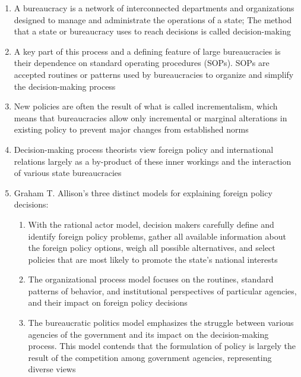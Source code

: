 \documentclass[12pt]{article}
\begin{document}
\begin{enumerate}
      \item A bureaucracy is a network of interconnected departments and organizations designed to manage and administrate the operations of a state; The method that a state or bureaucracy uses to reach decisions is called decision-making 

      \item A key part of this process and a defining feature of large bureaucracies is their dependence on standard operating procedures (SOPs). SOPs are accepted routines or patterns used by bureaucracies to organize and simplify the decision-making process

      \item New policies are often the result of what is called incrementalism, which means that bureaucracies allow only incremental or marginal alterations in existing policy to prevent major changes from established norms

      \item Decision-making process theorists view foreign policy and international relations largely as a by-product of these inner workings and the interaction of various state bureaucracies

      \item Graham T. Allison’s three distinct models for explaining foreign policy decisions:

        \begin{enumerate}

          \item With the rational actor model, decision makers carefully define and identify foreign policy problems, gather all available information about the foreign policy options, weigh all possible alternatives, and select policies that are most likely to promote the state’s national interests

          \item The organizational process model focuses on the routines, standard patterns of behavior, and institutional perspectives of particular agencies, and their impact on foreign policy decisions

          \item The bureaucratic politics model emphasizes the struggle between various agencies of the government and its impact on the decision-making process. This model contends that the formulation of policy is largely the result of the competition among government agencies, representing diverse views

        \end{enumerate}


\end{enumerate}
\end{document}
